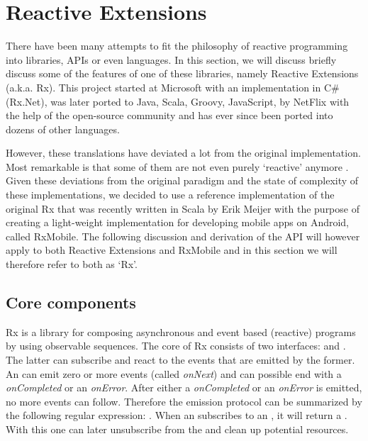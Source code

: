 \section{Reactive Extensions}
There have been many attempts to fit the philosophy of reactive programming into libraries, APIs or even languages.  In this section, we will discuss briefly discuss some of the features of one of these libraries, namely Reactive Extensions (a.k.a. Rx). This project started at Microsoft with an implementation in C\#  (Rx.Net), was later ported to Java, Scala, Groovy, JavaScript,  by NetFlix with the help of the open-source community and has ever since been ported into dozens of other languages.


However, these translations have deviated a lot from the original implementation. Most remarkable is that some of them are not even purely `reactive' anymore . Given these deviations from the original paradigm and the state of complexity of these implementations, we decided to use a reference implementation of the original Rx that was recently written in Scala by Erik Meijer with the purpose of creating a light-weight implementation for developing mobile apps on Android, called RxMobile.  The following discussion and derivation of the API will however apply to both Reactive Extensions and RxMobile and in this section we will therefore refer to both as `Rx'.

\subsection{Core components}
Rx is a library for composing asynchronous and event based (reactive) programs by using observable sequences. The core of Rx consists of two interfaces: \obs and \obv. The latter can subscribe and react to the events that are emitted by the former. An \obs can emit zero or more events (called \textit{onNext}) and can possible end with a \textit{onCompleted} or an \textit{onError}. After either a \textit{onCompleted} or an \textit{onError} is emitted, no more events can follow. Therefore the emission protocol can be summarized by the following regular expression: .  When an \obv subscribes to an \obs,  it will return a \subs. With this one can later unsubscribe from the \obs and clean up potential resources.

